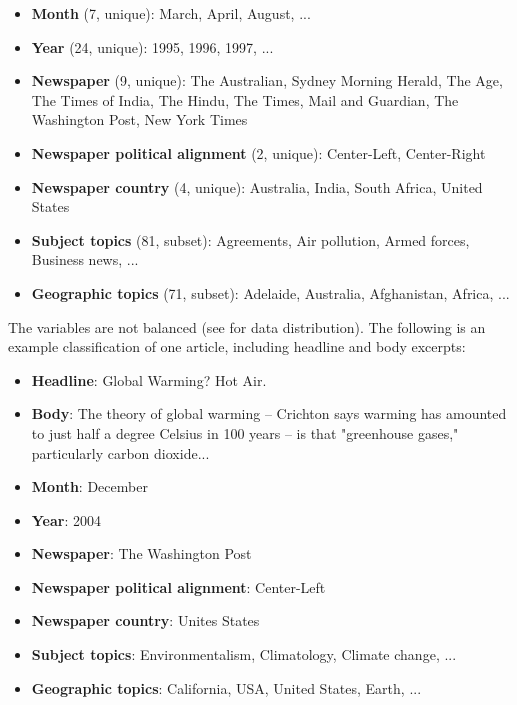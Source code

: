 \begin{itemize}[noitemsep,left=0.4cm]
\item \textbf{Month} (7, unique):
March,
April,
August,
...
\item \textbf{Year} (24, unique):
1995,
1996,
1997,
...
\item \textbf{Newspaper} (9, unique):
The Australian, 
Sydney Morning Herald,
The Age,
The Times of India,
The Hindu,
The Times,
Mail and Guardian,
The Washington Post,
New York Times 
\item \textbf{Newspaper political alignment} (2, unique): Center-Left, Center-Right
\item \textbf{Newspaper country} (4, unique): Australia, India, South Africa, United States
\item \textbf{Subject topics} (81, subset): 
Agreements,
Air pollution,
Armed forces,
Business news,
...
\item \textbf{Geographic topics} (71, subset):
Adelaide,
Australia,
Afghanistan,
Africa,
...
\end{itemize}

The variables are not balanced (see  for data distribution).
The following is an example classification of one article, including headline and body excerpts:

\begin{itemize}[noitemsep,left=0.4cm]
\item \textbf{Headline}:
{Global Warming? Hot Air.}
\item \textbf{Body}:
{The theory of global warming -- Crichton says warming has amounted to just half a degree Celsius in 100 years -- is that "greenhouse gases," particularly carbon dioxide...}
\item \textbf{Month}: {December}
\item \textbf{Year}: {2004}
\item \textbf{Newspaper}: {The Washington Post}
\item \textbf{Newspaper political alignment}: {Center-Left}
\item \textbf{Newspaper country}: {Unites States}
\item \textbf{Subject topics}:
{Environmentalism},
{Climatology},
{Climate change},
{...}
\item \textbf{Geographic topics}:
{California, USA},
{United States},
{Earth},
{...}
\end{itemize}

